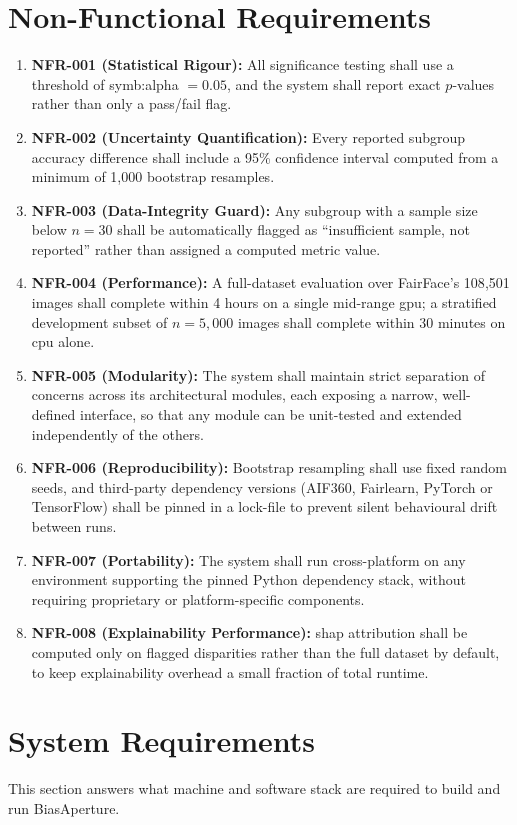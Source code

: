 \section{Non-Functional Requirements}

\begin{enumerate}
    \item \textbf{NFR-001 (Statistical Rigour):} All significance testing shall use a threshold of \gls{symb:alpha} $= 0.05$, and the system shall report exact $p$-values rather than only a pass/fail flag.
    \item \textbf{NFR-002 (Uncertainty Quantification):} Every reported subgroup accuracy difference shall include a 95\% confidence interval computed from a minimum of 1{,}000 bootstrap resamples.
    \item \textbf{NFR-003 (Data-Integrity Guard):} Any subgroup with a sample size below $n = 30$ shall be automatically flagged as ``insufficient sample, not reported'' rather than assigned a computed metric value.
    \item \textbf{NFR-004 (Performance):} A full-dataset evaluation over FairFace's 108{,}501 images shall complete within 4 hours on a single mid-range \gls{gpu}; a stratified development subset of $n = 5{,}000$ images shall complete within 30 minutes on \gls{cpu} alone.
    \item \textbf{NFR-005 (Modularity):} The system shall maintain strict separation of concerns across its architectural modules, each exposing a narrow, well-defined interface, so that any module can be unit-tested and extended independently of the others.
    \item \textbf{NFR-006 (Reproducibility):} Bootstrap resampling shall use fixed random seeds, and third-party dependency versions (AIF360, Fairlearn, PyTorch or TensorFlow) shall be pinned in a lock-file to prevent silent behavioural drift between runs.
    \item \textbf{NFR-007 (Portability):} The system shall run cross-platform on any environment supporting the pinned Python dependency stack, without requiring proprietary or platform-specific components.
    \item \textbf{NFR-008 (Explainability Performance):} \gls{shap} attribution shall be computed only on flagged disparities rather than the full dataset by default, to keep explainability overhead a small fraction of total runtime.
\end{enumerate}

\section{System Requirements}
This section answers what machine and software stack are required to build and run BiasAperture.


